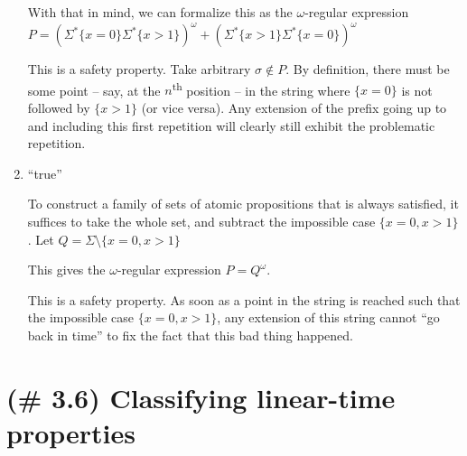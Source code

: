 \documentclass[letterpaper,11pt]{article}
\begin{document}
\begin{enumerate}
        With that in mind, we can formalize this as the $\omega$-regular
        expression
        $
        P
        = (\Sigma^*\{x=0\}\Sigma^*\{x>1\})^\omega
        + (\Sigma^*\{x>1\}\Sigma^*\{x=0\})^\omega
        $

        This is a safety property. Take arbitrary $\sigma \notin P$. By
        definition, there must be some point -- say, at the
        $n$\textsuperscript{th} position -- in the string where $\{x = 0\}$ is
        not followed by $\{x > 1\}$ (or vice versa). Any extension of the
        prefix going up to and including this first repetition will clearly
        still exhibit the problematic repetition.

    \item ``true''

        To construct a family of sets of atomic propositions that is always
        satisfied, it suffices to take the whole set, and subtract the
        impossible case $\{x=0, x>1\}$. Let
        $Q = \Sigma \setminus \{x = 0, x > 1\}$

        This gives the $\omega$-regular expression
        $P = Q^\omega$.

        This is a safety property. As soon as a point in the string is reached
        such that the impossible case $\{x = 0, x > 1\}$, any extension of this
        string cannot ``go back in time'' to fix the fact that this bad thing
        happened.
\end{enumerate}

\section{(\# 3.6) Classifying linear-time properties}
\end{document}
